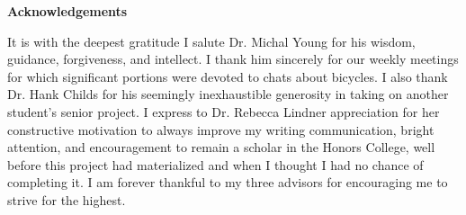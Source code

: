 \newpage
\thispagestyle{plain}
\begin{center}

\normalsize \textbf {Acknowledgements}
\end{center}


It is with the deepest gratitude I salute Dr. Michal Young for his wisdom, guidance, forgiveness, and intellect. I thank him sincerely for our weekly meetings for which significant portions were devoted to chats about bicycles. I also thank Dr. Hank Childs for his seemingly inexhaustible generosity in taking on another student's senior project. I express to Dr. Rebecca Lindner appreciation for her constructive motivation to always improve my writing communication, bright attention, and encouragement to remain a scholar in the Honors College, well before this project had materialized and when I thought I had no chance of completing it. I am forever thankful to my three advisors for encouraging me to strive for the highest.

\newpage